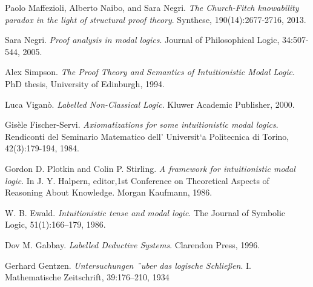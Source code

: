 \documentclass[twoside]{aiml18}
\begin{document}
\begin{thebibliography}{4}
	Paolo Maffezioli, Alberto Naibo, and Sara Negri. \emph{The Church-Fitch knowability paradox in the light of structural proof theory}. Synthese, 190(14):2677-2716, 2013. 
	
	
	Sara Negri. \emph{Proof analysis in modal logics}. Journal of Philosophical Logic, 34:507-544, 2005. 
	
	Alex Simpson. \emph{The Proof Theory and Semantics of Intuitionistic Modal Logic}. PhD thesis, University of Edinburgh, 1994. 
	
	Luca Vigan\`o. \emph{Labelled Non-Classical Logic}. Kluwer Academic Publisher, 2000. 
	
	
	Gis\`ele Fischer-Servi.\emph{ Axiomatizations for some intuitionistic modal logics}. Rendiconti del Seminario Matematico dell’ Universit`a Politecnica di Torino, 42(3):179-194, 1984.
	
	Gordon D. Plotkin and Colin P. Stirling. \emph{A framework for intuitionistic modal logic}. In J. Y. Halpern, editor,1st Conference on Theoretical Aspects of Reasoning About Knowledge.
	Morgan Kaufmann, 1986.
	
	W. B. Ewald. \emph{Intuitionistic tense and modal logic}. The Journal of Symbolic Logic, 51(1):166–179, 1986.
	
	Dov M. Gabbay. \emph{Labelled Deductive Systems}. Clarendon Press, 1996.
	
	
	
	Gerhard Gentzen. \emph{Untersuchungen ¨uber das logische Schließen}. I. Mathematische
Zeitschrift, 39:176–210, 1934

\end{thebibliography}
\end{document}
